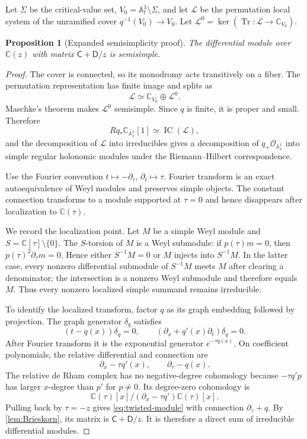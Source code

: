 \documentclass[11pt]{article}
\numberwithin{equation}{section}
\newtheorem{proposition}[theorem]{Proposition}
\theoremstyle{definition}
\theoremstyle{remark}
\newcommand{\C}{\mathbb C}
\newcommand{\Aone}{\mathbb A^1}
\newcommand{\Ocal}{\mathcal O}
\newcommand{\Lcal}{\mathscr L}
\begin{document}
Let $\Sigma$ be the critical-value set, $V_0=\Aone_t\setminus\Sigma$, and
let $\Lcal$ be the permutation local system of the unramified cover
$q^{-1}(V_0)\to V_0$.  Let
$\Lcal^0=\ker(\operatorname{Tr}:\Lcal\to\C_{V_0})$.

\begin{proposition}[Expanded semisimplicity proof]
\label{prop:semisimple-expanded}
The differential module over $\C(z)$ with matrix
$\mathsf C+\mathsf D/z$ is semisimple.
\end{proposition}

\begin{proof}
The cover is connected, so its monodromy acts transitively on a fiber.
The permutation representation has finite image and splits as
\[
  \Lcal\simeq\C_{V_0}\oplus\Lcal^0.
\]
Maschke's theorem makes $\Lcal^0$ semisimple.  Since $q$ is finite, it is
proper and small.  Therefore
\[
  Rq_*\C_{\Aone_x}[1]\simeq\operatorname{IC}(\Lcal),
\]
and the decomposition of $\Lcal$ into irreducibles gives a decomposition of
$q_+\Ocal_{\Aone_x}$ into simple regular holonomic modules under the
Riemann--Hilbert correspondence.

Use the Fourier convention
$t\mapsto-\partial_\tau$, $\partial_t\mapsto\tau$.  Fourier transform is an
exact autoequivalence of Weyl modules and preserves simple objects.  The
constant connection transforms to a module supported at $\tau=0$ and hence
disappears after localization to $\C(\tau)$.

We record the localization point.  Let $M$ be a simple Weyl module and
$S=\C[\tau]\setminus\{0\}$.  The $S$-torsion of $M$ is a Weyl submodule:
if $p(\tau)m=0$, then $p(\tau)^2\partial_\tau m=0$.  Hence either
$S^{-1}M=0$ or $M$ injects into $S^{-1}M$.  In the latter case, every nonzero
differential submodule of $S^{-1}M$ meets $M$ after clearing a denominator;
the intersection is a nonzero Weyl submodule and therefore equals $M$.
Thus every nonzero localized simple summand remains irreducible.

To identify the localized transform, factor $q$ as its graph embedding
followed by projection.  The graph generator $\delta_q$ satisfies
\[
  (t-q(x))\delta_q=0,
  \qquad
  (\partial_x+q'(x)\partial_t)\delta_q=0.
\]
After Fourier transform it is the exponential generator $e^{-\tau q(x)}$.
On coefficient polynomials, the relative differential and connection are
\[
  \partial_x-\tau q'(x),
  \qquad
  \partial_\tau-q(x).
\]
The relative de Rham complex has no negative-degree cohomology because
$-\tau q'p$ has larger $x$-degree than $p'$ for $p\ne0$.  Its degree-zero
cohomology is
\[
  \C(\tau)[x]\big/(\partial_x-\tau q')\C(\tau)[x].
\]
Pulling back by $\tau=-z$ gives \eqref{eq:twisted-module} with connection
$\partial_z+q$.  By \cref{lem:Brieskorn}, its matrix is
$\mathsf C+\mathsf D/z$.  It is therefore a direct sum of irreducible
differential modules.
\end{proof}
\end{document}
